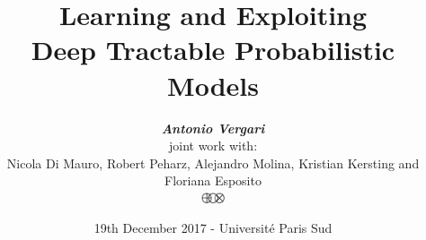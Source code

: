\documentclass[xcolor={usenames,dvipsnames,svgnames}, compress]{beamer}
\begin{document}
\newlength{\custombulletheight}
\setlength{\custombulletheight}{\dimexpr0.5\ht1-0.5\ht2}

\title{{\color{lacamlilac}Learning and Exploiting\\Deep Tractable Probabilistic Models}}
\author{\vspace{-10pt}\emph{\textbf{Antonio
      Vergari}}\\\vspace{10pt}joint  work with:\\Nicola Di Mauro, Robert
  Peharz, Alejandro Molina, Kristian Kersting and Floriana Esposito\\\vspace{10pt}\includegraphics[width=20pt]{figures/logo1}}

\date{19th December 2017 - Université Paris Sud}


{
  \begin{frame}
    \titlepage
  \end{frame}
}
\end{document}
